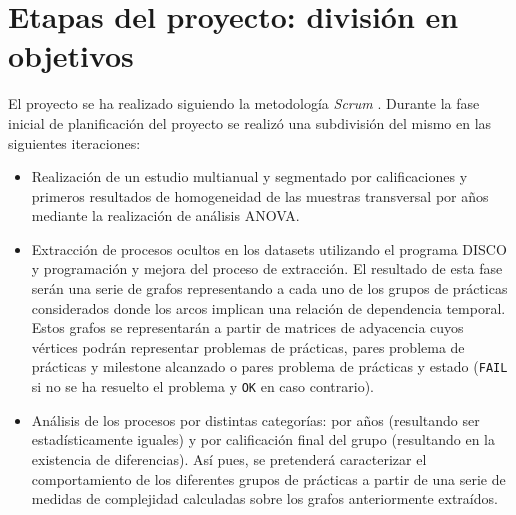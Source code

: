 \chapter{Etapas del proyecto: división en objetivos}\label{chapter:objetivos}

El proyecto se ha realizado siguiendo la metodología \emph{Scrum} \cite{kniberg2015scrum}. Durante la fase inicial de planificación del proyecto se realizó una subdivisión del mismo en las siguientes iteraciones:
\begin{itemize}
\item Realización de un estudio multianual y segmentado por calificaciones y primeros resultados de homogeneidad de las muestras transversal por años mediante la realización de análisis ANOVA.
\item Extracción de procesos ocultos en los datasets utilizando el programa DISCO y programación y mejora del proceso de extracción. El resultado de esta fase serán una serie de grafos representando a cada uno de los grupos de prácticas considerados donde los arcos implican una relación de dependencia temporal. Estos grafos se representarán a partir de matrices de adyacencia cuyos vértices podrán representar problemas de prácticas, pares problema de prácticas y milestone alcanzado o pares problema de prácticas y estado (\texttt{FAIL} si no se ha resuelto el problema y \texttt{OK} en caso contrario).
\item Análisis de los procesos por distintas categorías: por años (resultando ser estadísticamente iguales) y por calificación final del grupo (resultando en la existencia de diferencias). Así pues, se pretenderá caracterizar el comportamiento de los diferentes grupos de prácticas a partir de una serie de medidas de complejidad calculadas sobre los grafos anteriormente extraídos.
\end{itemize}